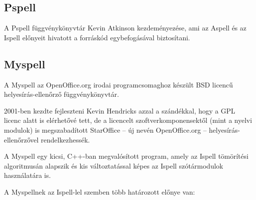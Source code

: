 \subsection{Pspell}

A Pspell függvénykönyvtár Kevin Atkinson kezdeményezése, ami
az Aspell és az Ispell előnyeit hivatott a forráskód
egybefogásával biztosítani.

\subsection{Myspell}

A Myspell az OpenOffice.org irodai programcsomaghoz
készült BSD licencű helyesírás-ellenőrző függvénykönyvtár.

2001-ben kezdte fejleszteni Kevin Hendricks azzal a
szándékkal, hogy a GPL licenc alatt is elérhetővé tett,
de a licencelt szoftverkomponensektől (mint a nyelvi
modulok) is megszabadított StarOffice -- új
nevén OpenOffice.org -- helyesírás-ellenőrzővel
rendelkezhessék.

A Myspell egy kicsi, C++-ban megvalósított program, amely
az Ispell tömörítési algoritmusán
alapszik és kis változtatással képes
az Ispell szótármodulok használatára is.

A Myspellnek az Ispell-lel szemben több határozott előnye van:

